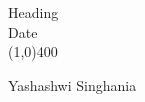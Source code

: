 \documentclass{article}
\begin{document}
\begin{titlepage}
\begin{center}

\Huge{Heading}\\
\Large{Date}\\
\vfill
\line(1,0){400}\\
\begin{large}
Yashashwi Singhania

\end{large}
\end{center}
\end{titlepage}
\end{document}
